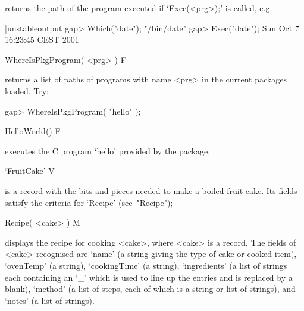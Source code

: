 returns the path of the program executed if `Exec(<prg>);' is called, e.g.

\beginexample|unstableoutput
gap> Which("date");         
"/bin/date"
gap> Exec("date");
Sun Oct  7 16:23:45 CEST 2001
\endexample

\>WhereIsPkgProgram( <prg> ) F

returns a list of paths of  programs  with  name  <prg>  in  the  current
packages loaded. Try:

\beginexample
gap> WhereIsPkgProgram( "hello" );
\endexample

\>HelloWorld() F

executes the C program `hello' provided by the {\Example} package.

\>`FruitCake' V

is a record with the bits and pieces needed to make a boiled fruit  cake.
Its fields satisfy the criteria for `Recipe' (see~"Recipe");

\>Recipe( <cake> ) M

displays the recipe for cooking <cake>, where <cake>  is  a  record.  The
fields of <cake> recognised are `name' (a string giving the type of  cake
or  cooked  item),  `ovenTemp'  (a  string),  `cookingTime'  (a  string),
`ingredients' (a list of strings each containing an `_' which is used  to
line up the entries and is replaced by a  blank),  `method'  (a  list  of
steps, each of which is a string or list of strings), and `notes' (a list
of strings).



